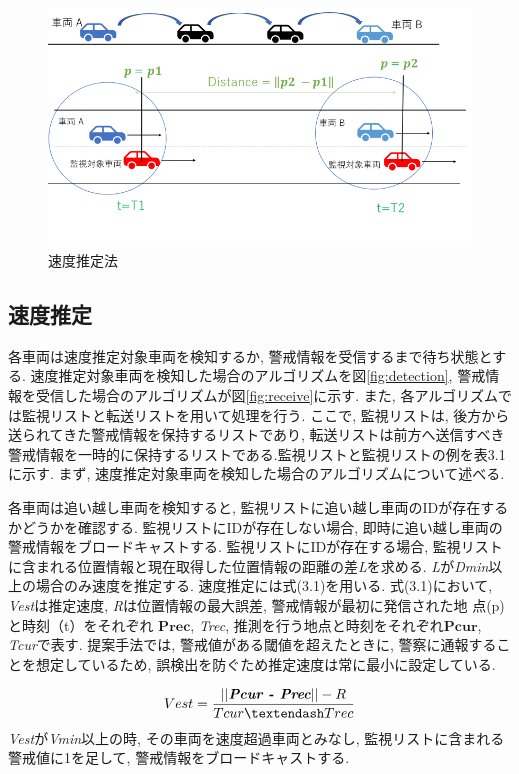 \documentclass[10pt]{jreport}
\begin{document}
\begin{figure}[H]
\centering
\includegraphics[width=12cm]{figures/3_2_1.png}
\caption{速度推定法}
\label{fig:Estimation}
\end{figure}

\subsection{速度推定}
各車両は速度推定対象車両を検知するか, 警戒情報を受信するまで待ち状態とする. 速度推定対象車両を検知した場合のアルゴリズムを図\ref{fig:detection}, 警戒情報を受信した場合のアルゴリズムが図\ref{fig:receive}に示す. また, 各アルゴリズムでは監視リストと転送リストを用いて処理を行う. ここで, 監視リストは, 後方から送られてきた警戒情報を保持するリストであり, 転送リストは前方へ送信すべき警戒情報を一時的に保持するリストである.監視リストと監視リストの例を表3.1に示す. まず, 速度推定対象車両を検知した場合のアルゴリズムについて述べる.

各車両は追い越し車両を検知すると, 監視リストに追い越し車両のIDが存在するかどうかを確認する. 監視リストにIDが存在しない場合, 即時に追い越し車両の警戒情報をブロードキャストする. 監視リストにIDが存在する場合, 監視リストに含まれる位置情報と現在取得した位置情報の距離の差{\it L}を求める. {\it L}が{\it Dmin}以上の場合のみ速度を推定する. 速度推定には式(3.1)を用いる. 式(3.1)において, {\it Vest}は推定速度, {\it R}は位置情報の最大誤差, 警戒情報が最初に発信された地 点(p)と時刻（t）をそれぞれ $\bm{Prec}$, {\it Trec}, 推測を行う地点と時刻をそれぞれ$\bm{Pcur}$, {\it Tcur}で表す. 提案手法では, 警戒値がある閾値を超えたときに, 警察に通報することを想定しているため, 誤検出を防ぐため推定速度は常に最小に設定している. 

 

\begin{equation}
Vest = \dfrac{||\textit{\textbf{Pcur - Prec}}|| - R}{Tcur – Trec}
\end{equation}
{\it Vest}が{\it Vmin}以上の時, その車両を速度超過車両とみなし, 監視リストに含まれる警戒値に1を足して, 警戒情報をブロードキャストする.
\end{document}
